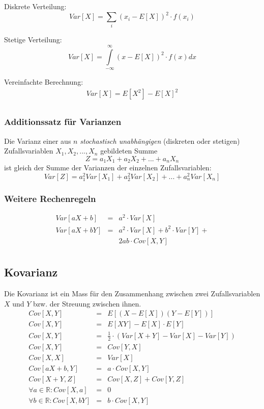 \documentclass[10pt,a4paper,twocolumn]{article}
\begin{document}
\vspace{10pt}

Diskrete Verteilung:
\[
Var[X]=\sum\limits_{i}(x_i-E[X])^2\cdot f(x_i)
\]

Stetige Verteilung:
\[
Var[X]=\int\limits_{-\infty}^{\infty}(x-E[X])^2\cdot f(x)dx
\]

Vereinfachte Berechnung:
\[
\begin{array}{c}
	Var[X] = E[X^2] - E[X]^2 \\
\end{array}
\]

\subsubsection{Additionssatz für Varianzen}
Die Varianz einer aus $n$ \emph{stochastisch unabhängigen} (diskreten oder stetigen) Zufallsvariablen $X_1,X_2,...,X_n$ gebildeten Summe
\[
Z=a_1X_1+a_2X_2+...+a_nX_n
\]
ist gleich der Summe der Varianzen der einzelnen Zufallsvariablen:
\[
Var[Z]=a_1^2Var[X_1]+a_2^2Var[X_2]+...+a_n^2Var[X_n]
\]

\subsubsection{Weitere Rechenregeln}
\[
\begin{array}{rcl}
	Var[aX + b] & = & a^2 \cdot Var[X] \\
	Var[aX + bY] & = & a^2 \cdot Var[X] + b^2 \cdot Var[Y] + \\
	& &  2ab \cdot Cov[X,Y] \\
\end{array}	
\]

\subsection{Kovarianz}
Die Kovarianz ist ein Mass für den Zusammenhang zwischen zwei Zufallsvariablen $X$ und $Y$ bzw. der Streuung zwischen ihnen.
\[
\begin{array}{rcl}
	Cov[X,Y] & = & E[(X - E[X])(Y - E[Y])] \\
	Cov[X,Y] & = & E[XY] - E[X] \cdot E[Y] \\
	Cov[X,Y] & = & \frac{1}{2} \cdot \left(Var[X + Y] - Var[X] - Var[Y] \right)	\\
	Cov[X,Y] &= & Cov[Y,X] \\
	Cov[X,X] & = & Var[X] \\
	Cov[aX + b,Y] & = & a \cdot Cov[X,Y] \\
	Cov[X + Y,Z] & = & Cov[X,Z] + Cov[Y,Z] \\
	\forall a \in \mathbb{R}: Cov[X,a] & = & 0 \\
	\forall b \in \mathbb{R}: Cov[X,bY] & = & b \cdot Cov[X,Y] \\
\end{array}
\]
\end{document}
